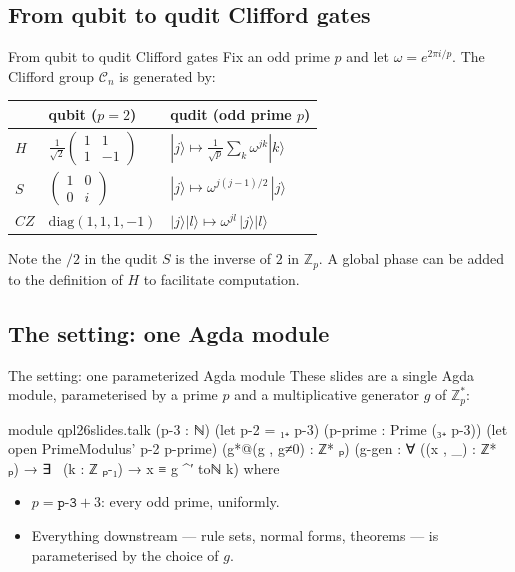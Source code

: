 \documentclass[aspectratio=169]{beamer}
\newcommand{\ket}[1]{|#1\rangle}
\begin{document}
\subsection{From qubit to qudit Clifford gates}
\begin{frame}{From qubit to qudit Clifford gates}
  Fix an odd prime $p$ and let $\omega = e^{2\pi i/p}$.
  The Clifford group $\mathcal{C}_n$ is generated by:
  \vfill
  \begin{center}
  \begin{tabular}{lll}
    \toprule
      & qubit ($p = 2$) & qudit (odd prime $p$) \\
    \midrule
    $H$  & $\frac{1}{\sqrt2}\begin{pmatrix}1&1\\1&-1\end{pmatrix}$
         & $\ket{j} \mapsto \tfrac{1}{\sqrt p}\sum_k \omega^{jk}\ket{k}$ \\[2ex]
    $S$  & $\begin{pmatrix}1&0\\0&i\end{pmatrix}$
         & $\ket{j} \mapsto \omega^{j(j-1)/2}\,\ket{j}$ \\[2ex]
    $CZ$ & $\mathrm{diag}(1,1,1,-1)$
         & $\ket{j}\ket{l} \mapsto \omega^{jl}\,\ket{j}\ket{l}$ \\
    \bottomrule
  \end{tabular}
  \end{center}
  \vfill Note the $/2$ in the qudit $S$ is the inverse of $2$ in
  $\mathbb{Z}_p$. A global phase can be added to the definition of $H$
  to facilitate computation.
\end{frame}

\subsection{The setting: one Agda module}

\begin{frame}{The setting: one parameterized Agda module}
  These slides are a single Agda module, parameterised by a prime $p$
  and a \alert{multiplicative generator} $g$ of $\mathbb{Z}_p^*$:

\begin{code}
module qpl26slides.talk
  (p-3 : ℕ)
  (let p-2 = ₁₊ p-3)
  (p-prime : Prime (₃₊ p-3))
  (let open PrimeModulus' p-2 p-prime)
  (g*@(g , g≠0) : ℤ* ₚ)
  (g-gen : ∀ ((x , _) : ℤ* ₚ) → ∃ \ (k : ℤ ₚ-₁) → x ≡ g ^′ toℕ k)
  where
\end{code}
\vfill
\vspace{-0.3cm}
  \begin{itemize}
    \item $p = \texttt{p-3} + 3$: every odd prime, uniformly.
    \item Everything downstream --- rule sets, normal forms, theorems ---
          is parameterised by the choice of $g$.
  \end{itemize}
\end{frame}
\end{document}
